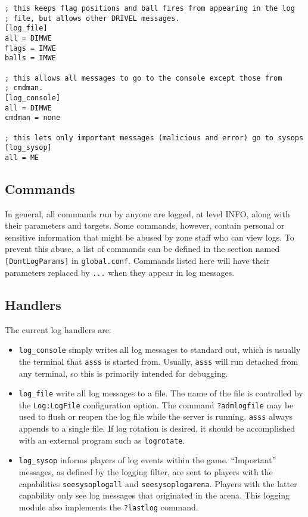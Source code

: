 \documentclass{article}
\newcommand{\asss}{\texttt{asss}}
\begin{document}
\begin{verbatim}
; this keeps flag positions and ball fires from appearing in the log
; file, but allows other DRIVEL messages.
[log_file]
all = DIMWE
flags = IMWE
balls = IMWE

; this allows all messages to go to the console except those from
; cmdman.
[log_console]
all = DIMWE
cmdman = none

; this lets only important messages (malicious and error) go to sysops
[log_sysop]
all = ME
\end{verbatim}


\subsection{Commands}

In general, all commands run by anyone are logged, at level INFO, along
with their parameters and targets. Some commands, however, contain
personal or sensitive information that might be abused by zone staff who
can view logs. To prevent this abuse, a list of commands can be defined
in the section named \verb/[DontLogParams]/ in \verb/global.conf/.
Commands listed here will have their parameters replaced by \verb/.../
when they appear in log messages.


\subsection{Handlers}

The current log handlers are:

\begin{itemize}

\item{\verb/log_console/} simply writes all log messages to standard
out, which is usually the terminal that \asss{} is started from.
Usually, \asss{} will run detached from any terminal, so this is
primarily intended for debugging.

\item{\verb/log_file/} write all log messages to a file. The name of the
file is controlled by the \verb/Log:LogFile/ configuration option. The
command \verb/?admlogfile/ may be used to flush or reopen the log file
while the server is running. \asss{} always appends to a single file. If
log rotation is desired, it should be accomplished with an external
program such as \verb/logrotate/.

\item{\verb/log_sysop/} informs players of log events within the game.
``Important'' messages, as defined by the logging filter, are sent to
players with the capabilities \verb/seesysoplogall/ and
\verb/seesysoplogarena/. Players with the latter capability only see log
messages that originated in the arena. This logging module also
implements the \verb/?lastlog/ command.

\end{itemize}
\end{document}
